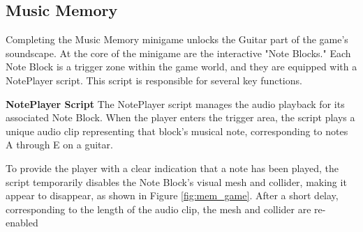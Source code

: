 \documentclass{l4proj}
\begin{document}
\subsection{Music Memory}
Completing the Music Memory minigame unlocks the Guitar part of the game's soundscape. At the core of the minigame are the interactive "Note Blocks." Each Note Block is a trigger zone within the game world, and they are equipped with a NotePlayer script. This script is responsible for several key functions.

\textbf{NotePlayer Script} \newline
The NotePlayer script manages the audio playback for its associated Note Block. When the player enters the trigger area, the script plays a unique audio clip representing that block's musical note, corresponding to notes A through E on a guitar.

To provide the player with a clear indication that a note has been played, the script temporarily disables the Note Block's visual mesh and collider, making it appear to disappear, as shown in Figure \ref{fig:mem_game}. After a short delay, corresponding to the length of the audio clip, the mesh and collider are re-enabled
\end{document}
